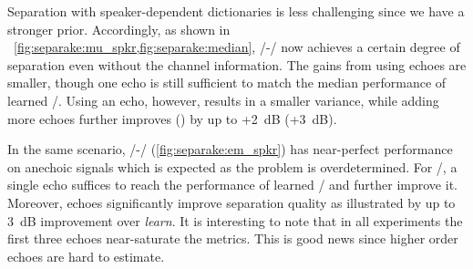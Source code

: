 \mynewline
Separation with speaker-dependent dictionaries is less challenging since we have a stronger prior.
Accordingly, as shown in ~\cref{fig:separake:mu_spkr,fig:separake:median}, \MU/-\NMF/ now achieves a certain degree of separation even without the channel information.
The gains from using echoes are smaller, though one echo is still sufficient to match the median performance of learned \RTFs/.
Using an echo, however, results in a smaller variance, while adding more echoes further improves \SDR{} (\SIR) by up to +2~dB (+3~dB).

\mynewline
In the same scenario, \EM/-\NMF/ (\cref{fig:separake:em_spkr}) has near-perfect performance on anechoic signals which is expected as the problem is overdetermined.
For \MU/, a single echo suffices to reach the performance of learned \RTFs/ and further improve it.
Moreover, echoes significantly improve separation quality as illustrated by up to 3~dB improvement over \textit{learn}.
It is interesting to note that in all experiments the first three echoes near-saturate the metrics.
This is good news since higher order echoes are hard to estimate.

